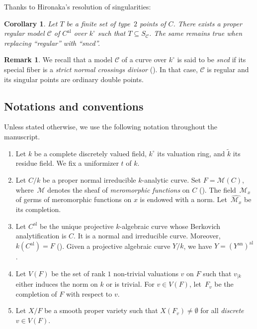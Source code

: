 \documentclass[JEP,XML,SOM,Unicode,NoFloatCountersInSection,published]{cedram}
\newcommand{\al}{\mathrm{al}}
\newtheorem{cor}[thm]{Corollary}
\theoremstyle{definition}
\newtheorem{rem}[thm]{Remark}
\begin{document}
Thanks to Hironaka's resolution of singularities:

\begin{cor} \label{lordan1}
Let $T$ be a finite set of type~$2$ points of $C$. There exists a proper regular model $\mathscr{C}$ of $C^{\al}$ over $k^{\circ}$ such that $T \subseteq S_{\mathscr{C}}$. The same remains true when replacing ``regular'' with ``\emph{sncd}''.
\end{cor}

\begin{rem} \label{sncd} We recall that a model $\mathcal{C}$ of a curve over $k^{\circ}$ is said to be \emph{sncd} if its special fiber is a \emph{strict normal crossings divisor} (\cf \cite[Tag\,0BI9]{stacks}). In that case, $\mathcal{C}$ is regular and its singular points are ordinary double points.
\end{rem}

\subsection{Notations and conventions} \label{1.1}

Unless stated otherwise, we use the following notation throughout the manuscript.

\begin{enumerate}
\item Let $k$ be a complete discretely valued field, $k^{\circ}$ its valuation ring, and $\widetilde{k}$ its residue field. We fix a uniformizer $t$ of $k$.

\item Let $C/k$ be a proper normal irreducible $k$-analytic curve. Set $F=\mathscr{M}(C)$, where~$\mathscr{M}$ denotes the sheaf of \emph{meromorphic functions} on $C$ (\cf \cite[1.7]{doktoratura}). The field~$\mathscr{M}_x$ of germs of meromorphic functions on $x$ is endowed with a norm. Let~$\widehat{\mathscr{M}_x}$ be its completion.

\item Let $C^{\al}$ be the unique projective $k$-algebraic curve whose Berkovich analytification is $C$. It is a normal and irreducible curve. Moreover, $k(C^{\al})=F$ (\cite[Prop.\,3.6.2]{Ber90}). Given a projective algebraic curve $Y/k$, we have $Y=(Y^{\mathrm{an}})^{\al}$.

\item Let $V(F)$ be the set of rank $1$ non-trivial valuations $v$ on $F$ such that $v_{|k}$ either induces the norm on $k$ or is trivial. For $v \in V(F)$, let~$F_v$ be the completion of $F$ with respect to $v$.

\item Let $X/F$ be a smooth proper variety such that $X(F_v) \neq \emptyset$ for all \emph{discrete} $v \in V(F)$.
\end{enumerate}
\end{document}
